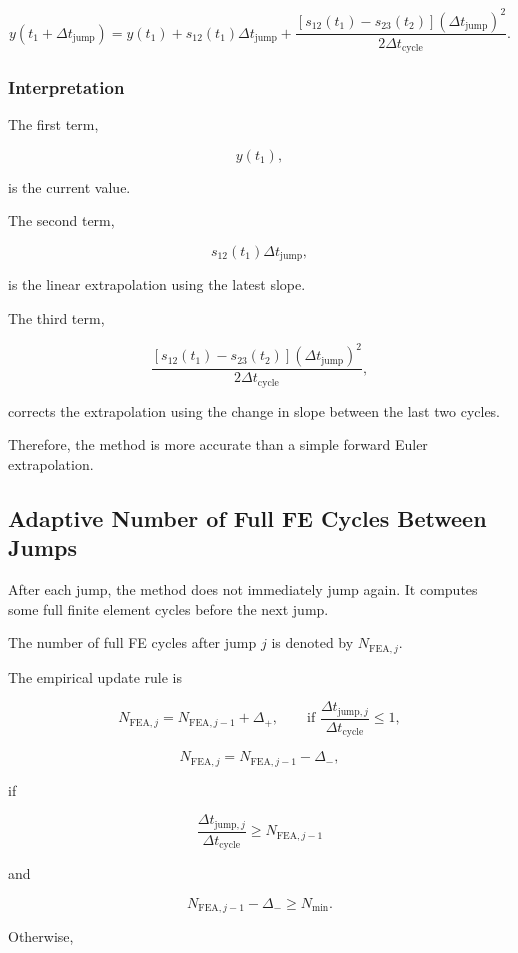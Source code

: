 ﻿\documentclass[11pt,a4paper]{article}
\begin{document}
\[
y(t_1+\Delta t_{\mathrm{jump}})
=
y(t_1)
+
s_{12}(t_1)\Delta t_{\mathrm{jump}}
+
\frac{
\left[
s_{12}(t_1)-s_{23}(t_2)
\right]
(\Delta t_{\mathrm{jump}})^2
}{
2\Delta t_{\mathrm{cycle}}
}.
\]

\subsubsection*{Interpretation}

The first term,

\[
y(t_1),
\]

is the current value.

The second term,

\[
s_{12}(t_1)\Delta t_{\mathrm{jump}},
\]

is the linear extrapolation using the latest slope.

The third term,

\[
\frac{
\left[
s_{12}(t_1)-s_{23}(t_2)
\right]
(\Delta t_{\mathrm{jump}})^2
}{
2\Delta t_{\mathrm{cycle}}
},
\]

corrects the extrapolation using the change in slope between the last two cycles.

Therefore, the method is more accurate than a simple forward Euler extrapolation.

\subsection{Adaptive Number of Full FE Cycles Between Jumps}

After each jump, the method does not immediately jump again. It computes some full finite element cycles before the next jump.

The number of full FE cycles after jump $j$ is denoted by $N_{\mathrm{FEA},j}$.

The empirical update rule is

\[
N_{\mathrm{FEA},j}
=
N_{\mathrm{FEA},j-1}
+
\Delta_+,
\qquad
\text{if }
\frac{\Delta t_{\mathrm{jump},j}}{\Delta t_{\mathrm{cycle}}}
\leq 1,
\]

\[
N_{\mathrm{FEA},j}
=
N_{\mathrm{FEA},j-1}
-
\Delta_-,
\]

if

\[
\frac{\Delta t_{\mathrm{jump},j}}{\Delta t_{\mathrm{cycle}}}
\geq
N_{\mathrm{FEA},j-1}
\]

and

\[
N_{\mathrm{FEA},j-1}-\Delta_- \geq N_{\min}.
\]

Otherwise,
\end{document}
